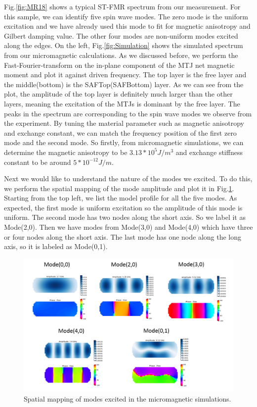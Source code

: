 Fig.\ref{fig:MR18} shows a typical ST-FMR spectrum from our measurement. For this sample, we can identify five spin wave modes. The zero mode is the uniform excitation and we have already used this mode to fit for magnetic anisotropy and Gilbert damping value. The other four modes are non-uniform modes excited along the edges. On the left, Fig.\ref{fig:Simulation} shows the simulated spectrum from our micromagnetic calculations. As we discussed before, we perform the Fast-Fourier-transform on the in-plane component of the MTJ net magnetic moment and plot it against driven frequency. The top layer is the free layer and the middle(bottom) is the SAFTop(SAFBottom) layer. As we can see from the plot, the amplitude of the top layer is definitely much larger than the other layers, meaning the excitation of the MTJs is dominant by the free layer. The peaks in the spectrum are corresponding to the spin wave modes we observe from the experiment. By tuning the material parameter such as magnetic anisotropy and exchange constant, we can match the frequency position of the first zero mode and the second mode. So firstly, from micromagnetic simulations, we can determine the magnetic anisotropy to be $3.13*10^5 J/m^3$ and exchange stiffness constant to be around $5*10^{-12} J/m$.

Next we would like to understand the nature of the modes we excited. To do this, we perform the spatial mapping of the mode amplitude and plot it in Fig.\ref{fig:mode}. Starting from the top left, we list the model profile for all the five modes. As expected, the first mode is uniform excitation so the amplitude of this mode is uniform. The second mode has two nodes along the short axis. So we label it as Mode(2,0). Then we have modes from Mode(3,0) and Mode(4,0) which have three or four nodes along the short axis. The last mode has one node along the long axis, so it is labeled as Mode(0,1).





\begin{figure}[h!]
  \centering
  \includegraphics[width=1.0\textwidth]{fig/Mode_pic.png}
   \caption{Spatial mapping of modes excited in the micromagnetic simulations. }
  \label{fig:mode}
\end{figure}

